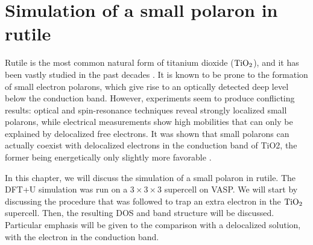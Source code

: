 \chapter{Simulation of a small polaron in rutile} \label{ch:simulation}
Rutile is the most common natural form of titanium dioxide ($\ce{TiO_2}$), and it has been vastly studied in the past decades \cite{franchini2021b}. It is known to be prone to the formation of small electron polarons, which give rise to an optically detected deep level below the conduction band. However, experiments seem to produce conflicting results: optical and spin-resonance techniques reveal strongly localized small polarons, while electrical measurements show high mobilities that can only be explained by delocalized free electrons. It was shown that small polarons can actually coexist with delocalized electrons in the conduction band of TiO2, the former being energetically only slightly more favorable \cite{janotti2013}.

In this chapter, we will discuss the simulation of a small polaron in rutile. The DFT+U simulation was run on a $3\times3\times3$ supercell on VASP. We will start by discussing the procedure that was followed to trap an extra electron in the $\ce{TiO_2}$ supercell. Then, the resulting DOS and band structure will be discussed. Particular emphasis will be given to the comparison with a delocalized solution, with the electron in the conduction band.



